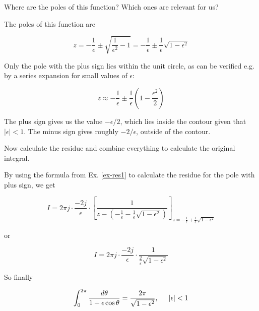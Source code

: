 \begin{cue}
  Where are the poles of this function? Which ones are relevant for us?
\end{cue}

The poles of this function are

\begin{equation}
z = - \frac{1}{\epsilon} \pm \sqrt{ \frac{1}{\epsilon^2} - 1} = - \frac{1}{\epsilon} \pm \frac{1}{\epsilon} \sqrt{1 - \epsilon^2}
\end{equation} 

Only the pole with the plus sign lies within the unit circle, as can be verified e.g. by a series expansion for small values of $\epsilon$:

\begin{equation}
z \approx - \frac{1}{\epsilon} \pm  \frac{1}{\epsilon} \left(1 - \frac{\epsilon^2}{2} \right)
\end{equation} 

The plus sign gives us the value $-\epsilon / 2$, which lies inside the contour given that $|\epsilon| < 1$. The minus sign gives roughly $-2/\epsilon$, outside of the contour.

\begin{cue}
Now calculate the residue and combine everything to calculate the original integral.
\end{cue}

By using the formula from Ex. \ref{ex-res1} to calculate the residue for the pole with plus sign, we get

\begin{equation}
I = 2 \pi j \cdot \frac{-2j}{\epsilon} \cdot \left[\frac{1}{z - (-\frac{1}{\epsilon} -
\frac{1}{\epsilon} \sqrt{1 - \epsilon^2})}\right]_{z = - \frac{1}{\epsilon} +
\frac{1}{\epsilon} \sqrt{1 - \epsilon^2}}
\end{equation}

or

\begin{equation}
I = 2 \pi j \cdot \frac{-2j}{\epsilon} \cdot \frac{1}{\frac{2}{\epsilon} \sqrt{1
- \epsilon^2}}
\end{equation}

So finally

\begin{equation}
\int_0^{2 \pi} \frac{d \theta}{1 + \epsilon \cos \theta} = \frac{2 \pi}{\sqrt{1
- \epsilon^2}}, \hspace{0.5cm} |\epsilon| < 1
\end{equation} 
 

